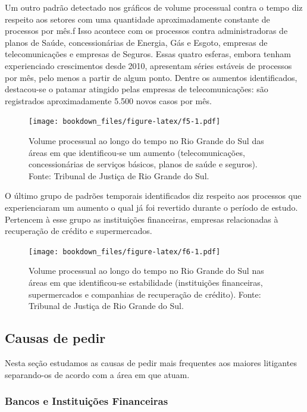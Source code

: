 \documentclass[]{report}
\begin{document}
Um outro padrão detectado nos gráficos de volume processual contra o
tempo diz respeito aos setores com uma quantidade aproximadamente
constante de processos por mês.f Isso acontece com os processos contra
administradoras de planos de Saúde, concessionárias de Energia, Gás e
Esgoto, empresas de telecomunicações e empresas de Seguros. Essas quatro
esferas, embora tenham experienciado crescimentos desde 2010, apresentam
séries estáveis de processos por mês, pelo menos a partir de algum
ponto. Dentre os aumentos identificados, destacou-se o patamar atingido
pelas empresas de telecomunicações: são registrados aproximadamente
5.500 novos casos por mês.

\begin{figure}[htbp]
\centering
\texttt{[image: bookdown\_files/figure-latex/f5-1.pdf]}
\caption{\label{fig:f5}Volume processual ao longo do tempo no Rio Grande do
Sul das áreas em que identificou-se um aumento (telecomunicações,
concessionárias de serviços básicos, planos de saúde e seguros). Fonte:
Tribunal de Justiça de Rio Grande do Sul.}
\end{figure}

O último grupo de padrões temporais identificados diz respeito aos
processos que experienciaram um aumento o qual já foi revertido durante
o período de estudo. Pertencem à esse grupo as instituições financeiras,
empresas relacionadas à recuperação de crédito e supermercados.

\begin{figure}[htbp]
\centering
\texttt{[image: bookdown\_files/figure-latex/f6-1.pdf]}
\caption{\label{fig:f6}Volume processual ao longo do tempo no Rio Grande do
Sul nas áreas em que identificou-se estabilidade (instituições
financeiras, supermercados e companhias de recuperação de crédito).
Fonte: Tribunal de Justiça de Rio Grande do Sul.}
\end{figure}

\subsection{Causas de pedir}\label{causas-de-pedir}

Nesta seção estudamos as causas de pedir mais frequentes aos maiores
litigantes separando-os de acordo com a área em que atuam.

\subsubsection{Bancos e Instituições
Financeiras}\label{bancos-e-instituicoes-financeiras}
\end{document}

